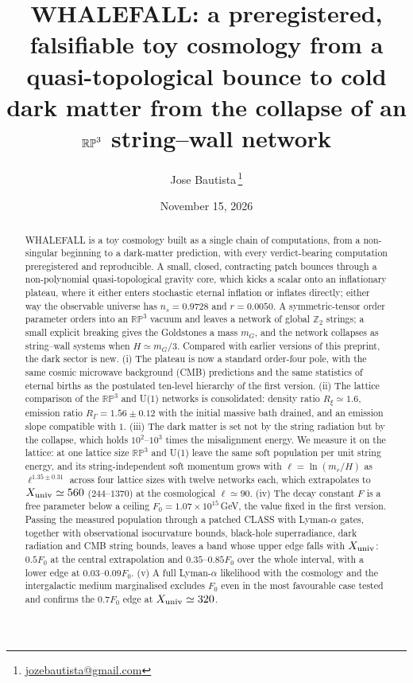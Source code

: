 \documentclass[11pt,a4paper]{article}
\title{\textbf{WHALEFALL: a preregistered, falsifiable toy cosmology from a quasi-topological bounce to cold dark matter from the collapse of an $\RP$ string--wall network}}
\author{Jose Bautista\,\orcidlink{0009-0001-6655-4028}\thanks{\href{mailto:jozebautista@gmail.com}{jozebautista@gmail.com}}}
\date{November 15, 2026}
\newcommand{\RP}{\mathbb{RP}^3}
\newcommand{\Ztwo}{\mathbb{Z}_2}
\newcommand{\RG}{R_\Gamma}
\newcommand{\Rxi}{R_\xi}
\newcommand{\Xu}{X_{\rm univ}}
\begin{document}
\maketitle

\begin{abstract}
WHALEFALL is a toy cosmology built as a single chain of computations, from a non-singular beginning to a dark-matter prediction, with every verdict-bearing computation preregistered and reproducible.
A small, closed, contracting patch bounces through a non-polynomial quasi-topological gravity core, which kicks a scalar onto an inflationary plateau, where it either enters stochastic eternal inflation or inflates directly; either way the observable universe has $n_s=0.9728$ and $r=0.0050$.
A symmetric-tensor order parameter orders into an $\RP$ vacuum and leaves a network of global $\Ztwo$ strings; a small explicit breaking gives the Goldstones a mass $m_G$, and the network collapses as string--wall systems when $H\simeq m_G/3$.
Compared with earlier versions of this preprint, the dark sector is new.
(i) The plateau is now a standard order-four pole, with the same cosmic microwave background (CMB) predictions and the same statistics of eternal births as the postulated ten-level hierarchy of the first version.
(ii) The lattice comparison of the $\RP$ and U(1) networks is consolidated: density ratio $\Rxi\simeq1.6$, emission ratio $\RG=1.56\pm0.12$ with the initial massive bath drained, and an emission slope compatible with $1$.
(iii) The dark matter is set not by the string radiation but by the collapse, which holds $10^2$--$10^3$ times the misalignment energy. We measure it on the lattice: at one lattice size $\RP$ and U(1) leave the same soft population per unit string energy, and its string-independent soft momentum grows with $\ell=\ln(m_r/H)$ as $\ell^{1.35\pm0.31}$ across four lattice sizes with twelve networks each, which extrapolates to $\Xu\simeq560$ ($244$--$1370$) at the cosmological $\ell\simeq90$.
(iv) The decay constant $F$ is a free parameter below a ceiling $F_0=1.07\times10^{15}$\,GeV, the value fixed in the first version. Passing the measured population through a patched CLASS with Lyman-$\alpha$ gates, together with observational isocurvature bounds, black-hole superradiance, dark radiation and CMB string bounds, leaves a band whose upper edge falls with $\Xu$: $0.5F_0$ at the central extrapolation and $0.35$--$0.85F_0$ over the whole interval, with a lower edge at $0.03$--$0.09F_0$.
(v) A full Lyman-$\alpha$ likelihood with the cosmology and the intergalactic medium marginalised excludes $F_0$ even in the most favourable case tested and confirms the $0.7F_0$ edge at $\Xu\simeq320$.

\end{abstract}
\end{document}
